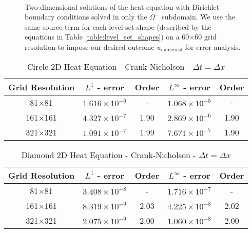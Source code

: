 \documentclass[oneside,12pt,final]{/Applications/TeX/packages/ucthesis-CA2012}
\begin{document}
\begin{mainmatter}
\begin{figure}[!h]
\centering
{} \quad
{}\\
 \quad
{}
  \caption[2D Heat Equation with Dirichlet Boundary Conditions for Various Level-Sets]{Two-dimensional solutions of the heat equation with Dirichlet boundary conditions solved in only the $\Omega^-$ subdomain. We use the same source term for each level-set shape (described by the equations in Table \ref{table:level_set_shapes}) on a 60$\times$60 grid resolution to impose our desired outcome $u_{\text{numerical}}$ for error analysis.}
  \label{fig:circles}
\end{figure}

\clearpage
\begin{table} [!h]
\caption{Circle 2D Heat Equation - Crank-Nicholson - $\Delta t = \Delta x$}\label{table:Circle_Crank}
\centering
\begin{tabular}{c c c c c}
\hline
Grid Resolution & $L^1$ - error           & Order  & $L^{\infty}$ - error        & Order \\ \hline
81$\times$81      & $1.616 \times 10^{-6}$  &   -    & $1.068 \times 10^{-5}$   &  -    \\
161$\times$161   & $4.327 \times 10^{-7}$  &  1.90  & $2.869 \times 10^{-6}$   & 1.90  \\
321$\times$321   & $1.091 \times 10^{-7}$  &  1.99  & $7.671 \times 10^{-7}$   & 1.90 
\end{tabular}
\end{table}

\begin{table} [!h]
\caption{Diamond 2D Heat Equation - Crank-Nicholson - $\Delta t = \Delta x$}
\centering
\begin{tabular}{c c c c c}
\hline
Grid Resolution & $L^1$ - error           & Order  & $L^{\infty}$ - error        & Order \\ \hline
81$\times$81     & $3.408 \times 10^{-8} $ &   -    & $1.716 \times 10^{-7}$   &  -    \\
161$\times$161   & $8.319 \times 10^{-9} $ &  2.03  & $4.225 \times 10^{-8}$   & 2.02  \\
321$\times$321   & $2.075 \times 10^{-9} $ &  2.00  & $1.060 \times 10^{-8}$  & 2.00  
\end{tabular}
\end{table}


\end{mainmatter}
\end{document}
